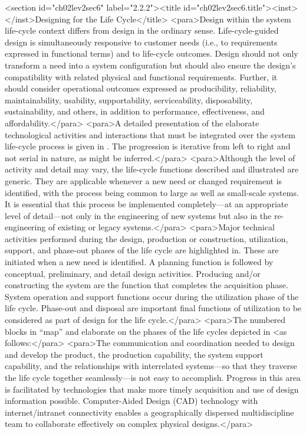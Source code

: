 <section id="ch02lev2sec6" label="2.2.2"><title id="ch02lev2sec6.title"><inst></inst>Designing for the Life Cycle</title>
<para>Design within the system life-cycle context differs from design in the ordinary sense. Life-cycle-guided design is simultaneously responsive to customer needs (i.e., to requirements expressed in functional terms) and to life-cycle outcomes. Design should not only transform a need into a system configuration but should also ensure the design’s compatibility with related physical and functional requirements. Further, it should consider operational outcomes expressed as producibility, reliability, maintainability, usability, supportability, serviceability, disposability, sustainability, and others, in addition to performance, effectiveness, and affordability.</para>
<para>A detailed presentation of the elaborate technological activities and interactions that must be integrated over the system life-cycle process is given in . The progression is iterative from left to right and not serial in nature, as might be inferred.</para>
<para>Although the level of activity and detail may vary, the life-cycle functions described and illustrated are generic. They are applicable whenever a new need or changed requirement is identified, with the process being common to large as well as small-scale systems. It is essential that this process be implemented completely—at an appropriate level of detail—not only in the engineering of new systems but also in the re-engineering of existing or legacy systems.</para>
<para>Major technical activities performed during the design, production or construction, utilization, support, and phase-out phases of the life cycle are highlighted in. These are initiated when a new need is identified. A planning function is followed by conceptual, preliminary, and detail design activities. Producing and/or constructing the system are the function that completes the acquisition phase. System operation and support functions occur during the utilization phase of the life cycle. Phase-out and disposal are important final functions of utilization to be considered as part of design for the life cycle.</para>
<para>The numbered blocks in “map” and elaborate on the phases of the life cycles depicted in <as follows:</para>
<para>The communication and coordination needed to design and develop the product, the production capability, the system support capability, and the relationships with interrelated systems—so that they traverse the life cycle together seamlessly—is not easy to accomplish. Progress in this area is facilitated by technologies that make more timely acquisition and use of design information possible. Computer-Aided Design (CAD) technology with internet/intranet connectivity enables a geographically dispersed multidiscipline team to collaborate effectively on complex physical designs.</para>
